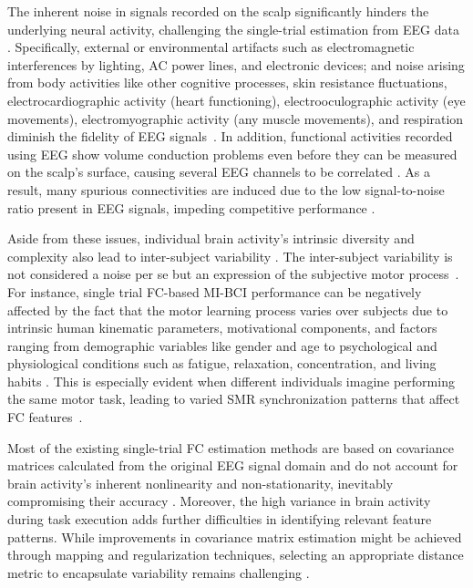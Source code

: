 The inherent noise in signals recorded on the scalp significantly hinders the underlying neural activity, challenging the single-trial estimation from EEG data \cite{si2020predicting, hata2016functional}. Specifically, external or environmental artifacts such as electromagnetic interferences by lighting, AC power lines, and electronic devices; and noise arising from body activities like other cognitive processes, skin resistance fluctuations, electrocardiographic activity (heart functioning), electrooculographic activity (eye movements), electromyographic activity (any muscle movements), and respiration diminish the fidelity of EEG signals~\cite{nentwich2020functional, somers2018generic}. In addition, functional activities recorded using EEG show volume conduction problems even before they can be measured on the scalp's surface, causing several EEG channels to be correlated \cite{qiao2023eeg, varone2021machine}. As a result, many spurious connectivities are induced due to the low signal-to-noise ratio present in EEG signals, impeding competitive performance \cite{bakhshayesh2019detecting}.

Aside from these issues, individual brain activity's intrinsic diversity and complexity also lead to inter-subject variability \cite{wriessnegger2020inter}. The inter-subject variability is not considered a noise per se but an expression of the subjective motor process~\cite{saha2020intra}. For instance, single trial FC-based MI-BCI performance can be negatively affected by the fact that the motor learning process varies over subjects due to intrinsic human kinematic parameters, motivational components, and factors ranging from demographic variables like gender and age to psychological and physiological conditions such as fatigue, relaxation, concentration, and living habits \cite{antonakakis2020inter, huang2023discrepancy}. This is especially evident when different individuals imagine performing the same motor task, leading to varied SMR synchronization patterns that affect FC features~\cite{wriessnegger2020inter, xie2020review}.

Most of the existing single-trial FC estimation methods are based on covariance matrices calculated from the original EEG signal domain and do not account for brain activity's inherent nonlinearity and non-stationarity, inevitably compromising their accuracy \cite{cao2022brain, epmoghaddam2022epileptic, miladinovic2021effect}. Moreover, the high variance in brain activity during task execution adds further difficulties in identifying relevant feature patterns. While improvements in covariance matrix estimation might be achieved through mapping and regularization techniques, selecting an appropriate distance metric to encapsulate variability remains challenging \cite{wang2020diverse,congedo2017fixed}.


